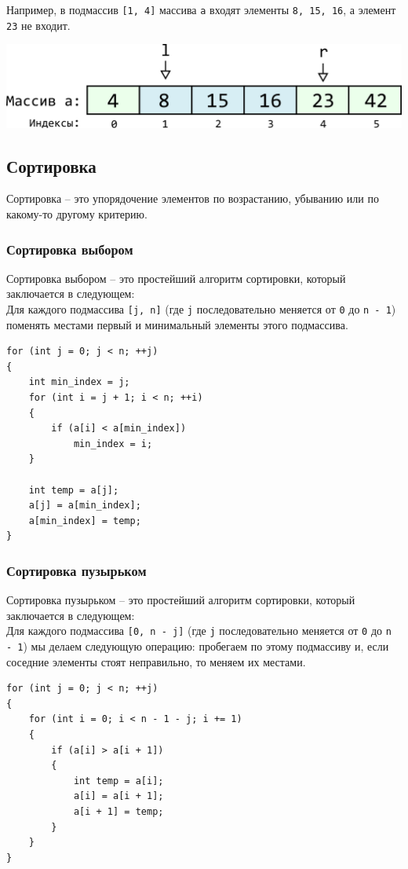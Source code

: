 \documentclass{article}
\begin{document}
Например, в подмассив \texttt{[1, 4]} массива \texttt{a} входят элементы \texttt{8, 15, 16}, а элемент \texttt{23} не входит.
\begin{center}
\includegraphics[scale=0.8]{../images/array_slice.png}
\end{center}


\subsection*{Сортировка}
Сортировка -- это упорядочение элементов по возрастанию, убыванию или по какому-то другому критерию.

\subsubsection*{Сортировка выбором} 
Сортировка выбором -- это простейший алгоритм сортировки, который заключается в следующем: \\
Для каждого подмассива \texttt{[j, n]} (где \texttt{j} последовательно меняется от \texttt{0} до \texttt{n - 1}) поменять местами первый и минимальный элементы этого подмассива. 


\begin{lstlisting}
for (int j = 0; j < n; ++j)
{
    int min_index = j;
    for (int i = j + 1; i < n; ++i)
    {
        if (a[i] < a[min_index])
            min_index = i;
    }

    int temp = a[j];
    a[j] = a[min_index];
    a[min_index] = temp;
}
\end{lstlisting}

\subsubsection*{Сортировка пузырьком} 
Сортировка пузырьком -- это простейший алгоритм сортировки, который заключается в следующем: \\
Для каждого подмассива \texttt{[0, n - j]} (где \texttt{j} последовательно меняется от \texttt{0} до \texttt{n - 1}) мы делаем следующую операцию: пробегаем по этому подмассиву и, если соседние элементы стоят неправильно, то меняем их местами.


\begin{lstlisting}
for (int j = 0; j < n; ++j)
{
    for (int i = 0; i < n - 1 - j; i += 1)
    {
        if (a[i] > a[i + 1])
        {
            int temp = a[i];
            a[i] = a[i + 1];
            a[i + 1] = temp;
        }
    }
}
\end{lstlisting}
\end{document}
